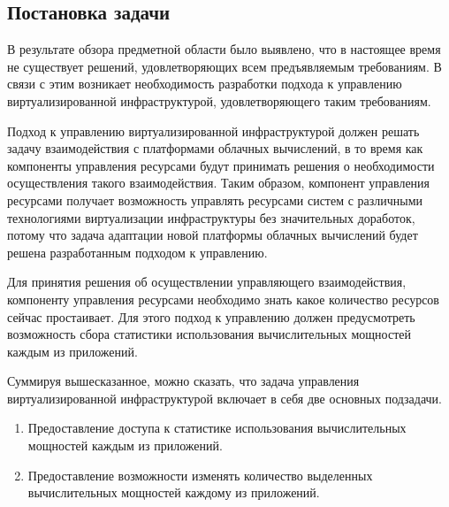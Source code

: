 \subsection{Постановка задачи}
\label{formulation}
В результате обзора предметной области было выявлено, что в настоящее время не существует решений, удовлетворяющих всем предъявляемым требованиям.
В связи с этим возникает необходимость разработки подхода к управлению виртуализированной инфраструктурой, удовлетворяющего таким требованиям.

Подход к управлению виртуализированной инфраструктурой должен решать задачу взаимодействия с платформами облачных вычислений, в то время как компоненты управления ресурсами будут принимать решения о необходимости осуществления такого взаимодействия.
Таким образом, компонент управления ресурсами получает возможность управлять ресурсами систем с различными технологиями виртуализации инфраструктуры без значительных доработок, потому что задача адаптации новой платформы облачных вычислений будет решена разработанным подходом к управлению.

Для принятия решения об осуществлении управляющего взаимодействия, компоненту управления ресурсами необходимо знать какое количество ресурсов сейчас простаивает\cite{fake-32}.
Для этого подход к управлению должен предусмотреть возможность сбора статистики использования вычислительных мощностей каждым из приложений\cite{fake-33}.

Суммируя вышесказанное, можно сказать, что задача управления виртуализированной инфраструктурой включает в себя две основных подзадачи.
\begin{enumerate}
    \item Предоставление доступа к статистике использования вычислительных мощностей каждым из приложений.
    \item Предоставление возможности изменять количество выделенных вычислительных мощностей каждому из приложений.
\end{enumerate}
